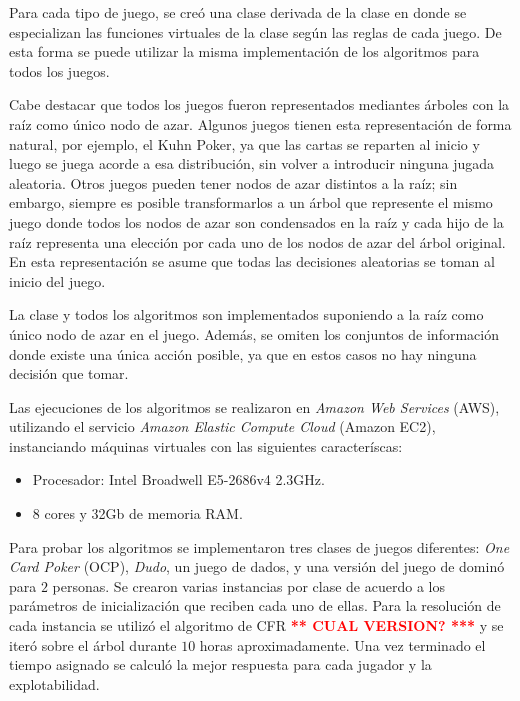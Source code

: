 Para cada tipo de juego, se creó una clase derivada de la clase  en donde se especializan las funciones virtuales de la clase  según las reglas de cada juego. De esta forma se puede utilizar la misma implementación de los algoritmos para todos los juegos.

Cabe destacar que todos los juegos fueron representados mediantes árboles con la raíz como único nodo de azar. Algunos juegos tienen esta representación de forma natural, por ejemplo, el Kuhn Poker, ya que las cartas se reparten al inicio y luego se juega acorde a esa distribución, sin volver a introducir ninguna jugada aleatoria. Otros juegos pueden tener nodos de azar distintos a la raíz; sin embargo, siempre es posible transformarlos a un árbol que represente el mismo juego donde todos los nodos de azar son condensados en la raíz y cada hijo de la raíz representa una elección por cada uno de los nodos de azar del árbol original. En esta representación se asume que todas las decisiones aleatorias se toman al inicio del juego.

La clase  y todos los algoritmos son implementados suponiendo a la raíz como único nodo de azar en el juego. Además, se omiten los conjuntos de información donde existe una única acción posible, ya que en estos casos no hay ninguna decisión que tomar. 

Las ejecuciones de los algoritmos se realizaron en \textit{Amazon Web Services} (AWS), utilizando el servicio \textit{Amazon Elastic Compute Cloud} (Amazon EC2), instanciando máquinas virtuales con las siguientes caracteríscas:
\begin{itemize}[noitemsep]
    \item Procesador: Intel Broadwell E5-2686v4  2.3GHz.
    \item 8 cores y 32Gb de memoria RAM.
\end{itemize}

Para probar los algoritmos se implementaron tres clases de juegos diferentes: \textit{One Card Poker} (OCP), \textit{Dudo}, un juego de dados, y una versión del juego de dominó para $2$ personas. Se crearon varias instancias por clase de acuerdo a los parámetros de inicialización que reciben cada uno de ellas. Para la resolución de cada instancia se utilizó el algoritmo de CFR \textcolor{red}{\bf *** CUAL VERSION? ***} y se iteró sobre el árbol durante $10$ horas aproximadamente. Una vez terminado el tiempo asignado se calculó la mejor respuesta para cada jugador y la explotabilidad. 

